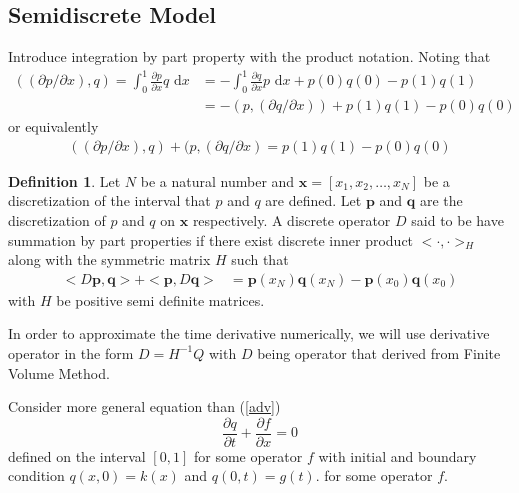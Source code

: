 \documentclass{article}
\newcommand{\dx}{\text{ d}x}
\theoremstyle{definition}
\newtheorem{definition}{Definition}[section]
\begin{document}
\subsection{Semidiscrete Model}
    Introduce integration by part property with the product notation. 
    Noting that 
    \begin{align}
        ((\partial p/\partial x),q) = \int_0^1 \frac{\partial p}{\partial x}q \dx 
        &= -\int_0^1 \frac{\partial q}{\partial x}p \dx + p(0)q(0) - p(1)q(1) \\
        &= - (p,(\partial q/\partial x)) + p(1)q(1) - p(0)q(0)
    \end{align}
    or equivalently 
    \begin{align}
        ((\partial p/\partial x),q) + (p,(\partial q/\partial x) = p(1)q(1) - p(0)q(0)
    \end{align}
    \begin{definition}\label{def-sbp-operator}
        Let $N$ be a natural number and $\mathbf{x} = [x_1,x_2,\dots,x_N]$ be a discretization of 
        the interval that $p$ and $q$ are defined. Let $\mathbf{p}$ and $\mathbf{q}$ are the 
        discretization of $p$ and $q$ on $\mathbf{x}$ respectively. A discrete operator ${D}$ said to be 
        have summation by part properties if there exist discrete inner product 
        $<\cdot,\cdot>_H$ along with the symmetric matrix $H$ such that 
        \begin{align}
            <D\mathbf{p},\mathbf{q}> + <\mathbf{p}, D \mathbf{q}> &= \mathbf{p}(x_N)\mathbf{q}(x_N) 
                - \mathbf{p}(x_0)\mathbf{q}(x_0)
        \end{align}
        with %
        $H$ be 
        positive semi definite matrices. %

    \end{definition}

    In order to approximate the time derivative numerically, we will use derivative operator 
    in the form $D = H^{-1}Q$ with $D$ being operator that derived from Finite Volume Method. 

    Consider more general equation than (\ref{adv})
    \begin{equation}\label{adv2}
        \frac{\partial q}{\partial t} + \frac{\partial f}{\partial x} = 0
    \end{equation}
    defined on the interval $[0,1]$ for some operator $f$ with initial and boundary condition 
    $q(x,0)=k(x)$ and $q(0,t)=g(t)$. 
    for some operator $f$. 
    
\end{document}
